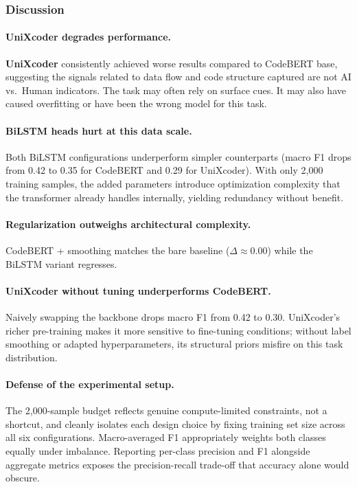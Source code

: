 \documentclass[11pt]{article}
\begin{document}
\subsubsection{Discussion}

\paragraph{UniXcoder degrades performance.}
\textbf{UniXcoder} consistently achieved worse results compared to CodeBERT base, suggesting the signals related to data flow and code structure captured are not AI vs.\ Human indicators. The task may often rely on surface cues. It may also have caused overfitting or have been the wrong model for this task.

\paragraph{BiLSTM heads hurt at this data scale.}
Both BiLSTM configurations underperform simpler counterparts (macro F1 drops from 0.42 to 0.35 for CodeBERT and 0.29 for UniXcoder). With only 2,000 training samples, the added parameters introduce optimization complexity that the transformer already handles internally, yielding redundancy without benefit.

\paragraph{Regularization outweighs architectural complexity.}
CodeBERT + smoothing matches the bare baseline ($\Delta \approx 0.00$) while the BiLSTM variant regresses.

\paragraph{UniXcoder without tuning underperforms CodeBERT.}
Naively swapping the backbone drops macro F1 from 0.42 to 0.30. UniXcoder's richer pre-training makes it more sensitive to fine-tuning conditions; without label smoothing or adapted hyperparameters, its structural priors misfire on this task distribution.

\paragraph{Defense of the experimental setup.}
The 2,000-sample budget reflects genuine compute-limited constraints, not a shortcut, and cleanly isolates each design choice by fixing training set size across all six configurations. Macro-averaged F1 appropriately weights both classes equally under imbalance. Reporting per-class precision and F1 alongside aggregate metrics exposes the precision-recall trade-off that accuracy alone would obscure.
\end{document}
